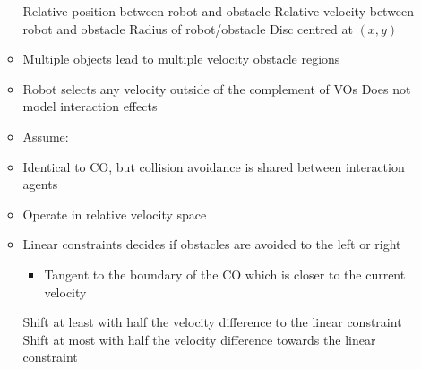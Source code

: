 \begin{itemize}
\begin{itemize}
                \begin{itemize*}
                     Relative position between robot and obstacle
                     Relative velocity between robot and obstacle
                     Radius of robot/obstacle
                     Disc centred at $(x,y)$
                \end{itemize*}
            \item Multiple objects lead to multiple velocity obstacle regions
            \item Robot selects any velocity outside of the complement of VOs
            \icon Does not model interaction effects
        \end{itemize}
        \begin{itemize}
            \item Assume:
            \item Identical to CO, but collision avoidance is shared between interaction agents
            \item Operate in relative velocity space
            \item Linear constraints decides if obstacles are avoided to the left or right
                \begin{itemize}
                    \item Tangent to the boundary of the CO which is closer to the current velocity
                \end{itemize}
             Shift at least with half the velocity difference to the linear constraint
             Shift at most with half the velocity difference towards the linear constraint
        \end{itemize}
\end{itemize}
